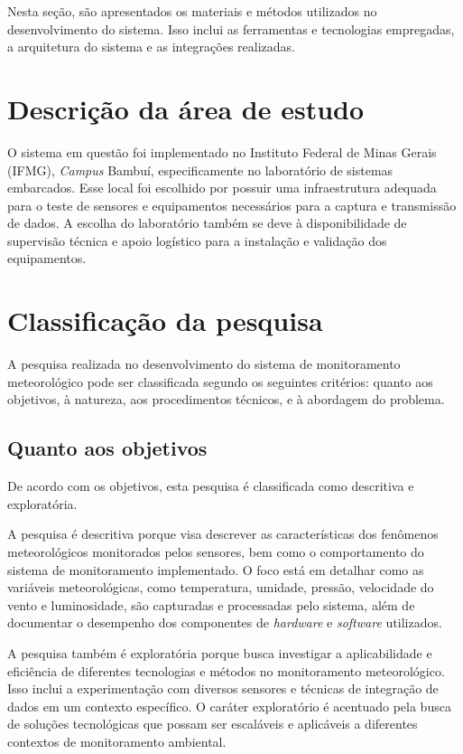 Nesta seção, são apresentados os materiais e métodos utilizados no desenvolvimento do sistema. Isso inclui as ferramentas e tecnologias empregadas, a arquitetura do sistema e as integrações realizadas.

\section{Descrição da área de estudo}
O sistema em questão foi implementado no Instituto Federal de Minas Gerais (IFMG), \textit{Campus} Bambuí, especificamente no laboratório de sistemas embarcados. Esse local foi escolhido por possuir uma infraestrutura adequada para o teste de sensores e equipamentos necessários para a captura e transmissão de dados. A escolha do laboratório também se deve à disponibilidade de supervisão técnica e apoio logístico para a instalação e validação dos equipamentos.

\section{Classificação da pesquisa}

A pesquisa realizada no desenvolvimento do sistema de monitoramento meteorológico pode ser classificada segundo os seguintes critérios: quanto aos objetivos, à natureza, aos procedimentos técnicos, e à abordagem do problema.

\subsection{Quanto aos objetivos}

De acordo com os objetivos, esta pesquisa é classificada como descritiva e exploratória. 

A pesquisa é descritiva porque visa descrever as características dos fenômenos meteorológicos monitorados pelos sensores, bem como o comportamento do sistema de monitoramento implementado. O foco está em detalhar como as variáveis meteorológicas, como temperatura, umidade, pressão, velocidade do vento e luminosidade, são capturadas e processadas pelo sistema, além de documentar o desempenho dos componentes de \textit{hardware} e \textit{software} utilizados.

A pesquisa também é exploratória porque busca investigar a aplicabilidade e eficiência de diferentes tecnologias e métodos no monitoramento meteorológico. Isso inclui a experimentação com diversos sensores e técnicas de integração de dados em um contexto específico. O caráter exploratório é acentuado pela busca de soluções tecnológicas que possam ser escaláveis e aplicáveis a diferentes contextos de monitoramento ambiental.

